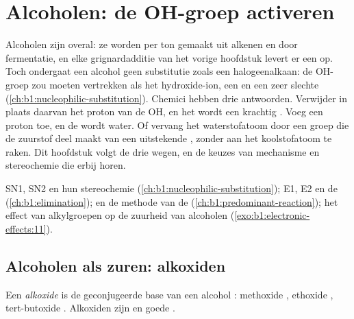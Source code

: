 \chapter{Alcoholen: de OH-groep activeren}\label{ch:b1:alcohol-activation}

Alcoholen zijn overal: ze worden per ton gemaakt uit alkenen en door
fermentatie, en elke grignardadditie van het vorige hoofdstuk levert er
een op. Toch ondergaat een alcohol geen substitutie zoals een
halogeenalkaan: de OH-groep zou moeten vertrekken als het hydroxide-ion,
een  en een zeer slechte 
(\cref{ch:b1:nucleophilic-substitution}). Chemici hebben drie
antwoorden. Verwijder in plaats daarvan het proton van de OH, en het
 wordt een krachtig . Voeg een proton toe, en de
 wordt water. Of vervang het waterstofatoom door een
groep die de zuurstof deel maakt van een uitstekende ,
zonder aan het koolstofatoom te raken. Dit hoofdstuk volgt de drie
wegen, en de keuzes van mechanisme en stereochemie die erbij horen.

\begin{recall}
SN1, SN2 en hun stereochemie (\cref{ch:b1:nucleophilic-substitution});
E1, E2 en de  (\cref{ch:b1:elimination}); 
en de methode van de  (\cref{ch:b1:predominant-reaction});
het effect van alkylgroepen op de zuurheid van alcoholen
(\cref{exo:b1:electronic-effects:11}).
\end{recall}

\section{Alcoholen als zuren: alkoxiden}

\begin{definition}[Alkoxide]\label{def:b1:alcohol-activation:alkoxide}
Een \emph{alkoxide} is de geconjugeerde base  van
een alcohol : methoxide , ethoxide ,
tert-butoxide . Alkoxiden zijn  en goede
.
\end{definition}

